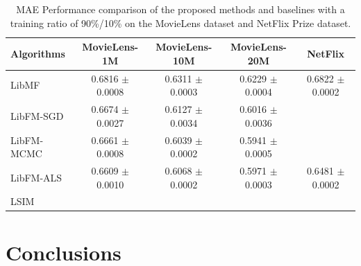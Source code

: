 \documentclass{sig-alternate-05-2015}
\begin{document}
\begin{table}[htpb]
	\centering
	\caption{MAE Performance comparison of the proposed methods and baselines with a training ratio of 90\%/10\%
    on the MovieLens dataset and NetFlix Prize dataset.}
	\label{tab:mae}
	\begin{tabular}{|l|c|c|c|c|}
		\hline
		\textbf{Algorithms} & \textbf{MovieLens-1M} & \textbf{MovieLens-10M} & \textbf{MovieLens-20M}  & \textbf{NetFlix} \\
		\hline
		LibMF      & 0.6816 $\pm$ 0.0008 & 0.6311 $\pm$ 0.0003 & 0.6229 $\pm$ 0.0004 & 0.6822 $\pm$ 0.0002 \\
		LibFM-SGD  & 0.6674 $\pm$ 0.0027 & 0.6127 $\pm$ 0.0034 & 0.6016 $\pm$ 0.0036 & \\
		LibFM-MCMC & 0.6661 $\pm$ 0.0008 & 0.6039 $\pm$ 0.0002 & 0.5941 $\pm$ 0.0005 & \\
		LibFM-ALS  & 0.6609 $\pm$ 0.0010 & 0.6068 $\pm$ 0.0002 & 0.5971 $\pm$ 0.0003 & 0.6481 $\pm$ 0.0002 \\
		LSIM       &  &  &  & \\
		\hline
	\end{tabular}
\end{table}



\section{Conclusions}





\end{document}
